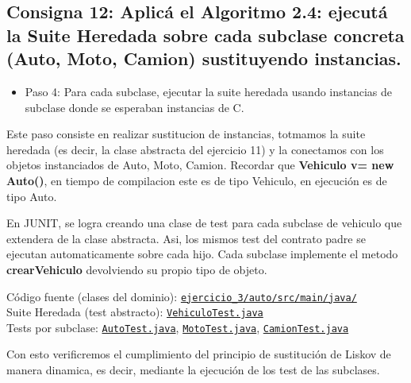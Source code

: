 \subsection{Consigna 12: Aplicá el Algoritmo 2.4: ejecutá la Suite Heredada sobre cada subclase concreta (Auto, Moto, Camion) sustituyendo instancias.}

\begin{itemize}
    \item Paso 4: Para cada subclase, ejecutar la suite heredada usando instancias de subclase donde se esperaban instancias de C.
\end{itemize}


Este paso consiste en realizar sustitucion de instancias, totmamos la suite heredada (es decir, la clase abstracta del ejercicio 11) y la conectamos con los objetos instanciados de Auto, Moto, Camion. Recordar que \textbf{Vehiculo v= new Auto()}, en tiempo de compilacion este es de tipo Vehiculo, en ejecución es de tipo Auto.

En JUNIT, se logra creando una clase de test para cada subclase de vehiculo que extendera de la clase abstracta. Asi, los mismos test del contrato padre se ejecutan automaticamente sobre cada hijo.
Cada subclase implemente el metodo \textbf{crearVehiculo} devolviendo su propio tipo de objeto.

Código fuente (clases del dominio): \href{https://github.com/Cristopher-Ovaillos/Unidad_2_ValidacionVerificacion/tree/main/Unidad_2_code/ejercicio_3/auto/src/main/java/com/enunciado_3/}{\texttt{ejercicio\_3/auto/src/main/java/}} \\
Suite Heredada (test abstracto): \href{https://github.com/Cristopher-Ovaillos/Unidad_2_ValidacionVerificacion/blob/main/Unidad_2_code/ejercicio_3/auto/src/test/java/com/enunciado_3/VehiculoTest.java}{\texttt{VehiculoTest.java}} \\
Tests por subclase: \href{https://github.com/Cristopher-Ovaillos/Unidad_2_ValidacionVerificacion/blob/main/Unidad_2_code/ejercicio_3/auto/src/test/java/com/enunciado_3/AutoTest.java}{\texttt{AutoTest.java}}, \href{https://github.com/Cristopher-Ovaillos/Unidad_2_ValidacionVerificacion/blob/main/Unidad_2_code/ejercicio_3/auto/src/test/java/com/enunciado_3/MotoTest.java}{\texttt{MotoTest.java}}, \href{https://github.com/Cristopher-Ovaillos/Unidad_2_ValidacionVerificacion/blob/main/Unidad_2_code/ejercicio_3/auto/src/test/java/com/enunciado_3/CamionTest.java}{\texttt{CamionTest.java}}

Con esto verificremos el cumplimiento del principio de sustitución de Liskov de manera dinamica, es decir, mediante la ejecución de los test de las subclases.

